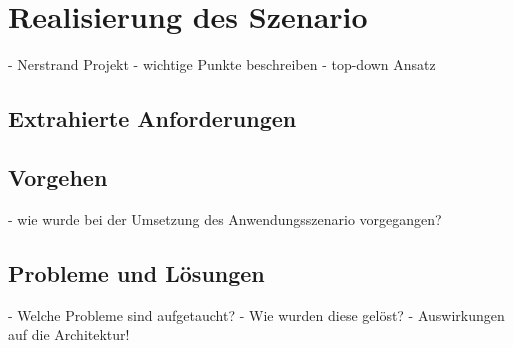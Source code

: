 \section{Realisierung des Szenario} %
\label{sec:realisierung_des_szenario}

  - Nerstrand Projekt
  - wichtige Punkte beschreiben
  - top-down Ansatz

\subsection{Extrahierte Anforderungen} %
\label{sub:extrahierte_anforderungen}


\subsection{Vorgehen} %
\label{sub:vorgehen_szenario}

  - wie wurde bei der Umsetzung des Anwendungsszenario vorgegangen?


\subsection{Probleme und Lösungen} %
\label{sub:probleme_und_loesungen_szenario}

  - Welche Probleme sind aufgetaucht?
  - Wie wurden diese gelöst?
  - Auswirkungen auf die Architektur!



